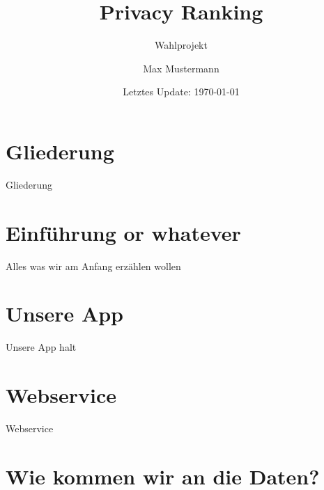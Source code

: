 \documentclass[compress,t]{beamer}
\title{Privacy Ranking}
\subtitle{Wahlprojekt}
\date{Letztes Update: \today}
\author{Max Mustermann}
\institute{Studienbereich Informatik\\Hochschule {RheinMain}}
\begin{document}
\maketitle


\section*{Gliederung}
\begin{frame}{Gliederung}
    \tableofcontents[hideallsubsections]
\end{frame}


\section{Einführung or whatever}

\begin{frame}
    Alles was wir am Anfang erzählen wollen
\end{frame}

\section{Unsere App}

\begin{frame}
    Unsere App halt
\end{frame}

\section{Webservice}

\begin{frame}
    Webservice
\end{frame}

\section{Wie kommen wir an die Daten?}
\end{document}
